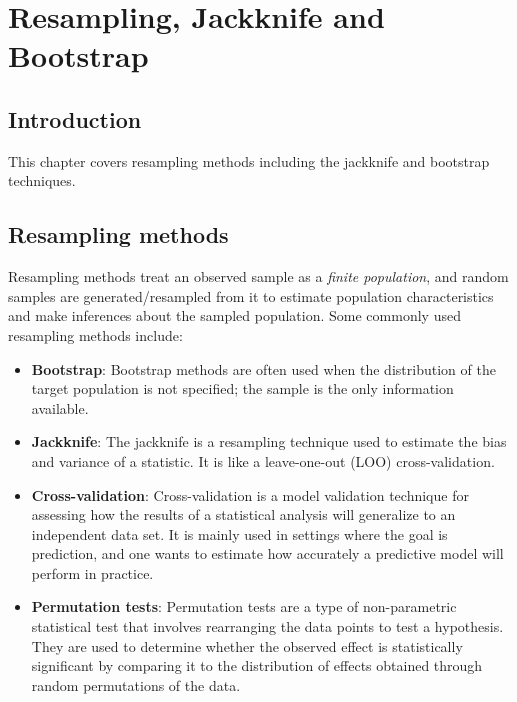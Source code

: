 \documentclass[
  letterpaper,
  DIV=11,
  numbers=noendperiod]{scrreprt}
\begin{document}

\chapter{Resampling, Jackknife and
Bootstrap}\label{resampling-jackknife-and-bootstrap}

\newcommand{\htt}{\hat{\theta}}
\newcommand{\E}{\mathbb{E}}
\newcommand{\var}{\mathbb{V}ar}
\newcommand{\b}{\mathbb{b}}

\section{Introduction}\label{introduction}

This chapter covers resampling methods including the jackknife and
bootstrap techniques.

\section{Resampling methods}\label{resampling-methods}

Resampling methods treat an observed sample as a \emph{finite
population}, and random samples are generated/resampled from it to
estimate population characteristics and make inferences about the
sampled population. Some commonly used resampling methods include:

\begin{itemize}
\item
  \textbf{Bootstrap}: Bootstrap methods are often used when the
  distribution of the target population is not specified; the sample is
  the only information available.
\item
  \textbf{Jackknife}: The jackknife is a resampling technique used to
  estimate the bias and variance of a statistic. It is like a
  leave-one-out (LOO) cross-validation.
\item
  \textbf{Cross-validation}: Cross-validation is a model validation
  technique for assessing how the results of a statistical analysis will
  generalize to an independent data set. It is mainly used in settings
  where the goal is prediction, and one wants to estimate how accurately
  a predictive model will perform in practice.
\item
  \textbf{Permutation tests}: Permutation tests are a type of
  non-parametric statistical test that involves rearranging the data
  points to test a hypothesis. They are used to determine whether the
  observed effect is statistically significant by comparing it to the
  distribution of effects obtained through random permutations of the
  data.
\end{itemize}
\end{document}
